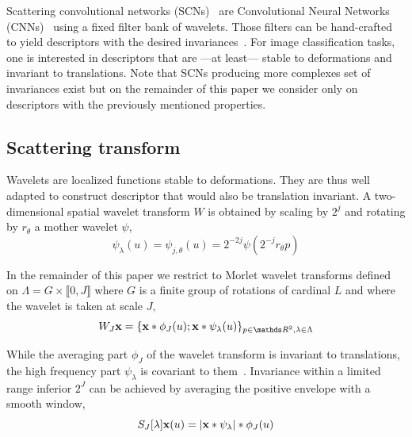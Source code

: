 \documentclass{article}
\begin{document}
    Scattering convolutional networks (SCNs)~\citep{bruna} are Convolutional Neural Networks (CNNs)~\citet{lecun1995convolutional} using a fixed filter bank of wavelets. Those filters can be hand-crafted to yield descriptors with the desired invariances~\citep{work translation invariant, work rotation invariant, work rigid motion}. For image classification tasks, one is interested in descriptors that are ---at least--- stable to deformations and invariant to translations. Note that SCNs producing more complexes set of invariances exist but on the remainder of this paper we consider only on descriptors with the previously mentioned properties.

  
  \subsection{Scattering transform}
    \label{subsec:SCN/ST}
    
    Wavelets are localized functions stable to deformations. They are thus well adapted to construct descriptor that would also be translation invariant. A two-dimensional spatial wavelet transform $W$ is obtained by scaling by $2^{j}$ and rotating by $r_{\theta}$ a mother wavelet $\psi$,
    \vspace{-5pt}
    \begin{equation}
      \label{eq:multi-scale directional wavelet}
      \psi_{\lambda}(u) = \psi_{j,\theta}(u) = 2^{-2j} \psi(2^{-j}r_{\theta}p)
    \end{equation}
    
    In the remainder of this paper we restrict to Morlet wavelet transforms defined on $\Lambda = G \times \llbracket 0,J \rrbracket$ where $G$ is a finite group of rotations of cardinal $L$ and where the wavelet is taken at scale $J$,
    \vspace{-5pt}
    \begin{equation}
      \label{eq:wavelet transform}
      W_{J}\bfx = \{ \bfx \ast \phi_{J}(u); \bfx \ast \psi_{\lambda}(u) \}_{p\in\dsR^{2},\lambda \in \Lambda}
    \end{equation}
    \vspace{-15pt}

    While the averaging part $\phi_{J}$ of the wavelet transform is invariant to translations, the high frequency part $\psi_{\lambda}$ is covariant to them~\citep{mallat}. Invariance within a limited range inferior $2^{J}$ can be achieved by averaging the positive envelope with a smooth window,
    \vspace{-5pt}
    \begin{equation}
      \label{eq:Scattering transform}
      S_{J}[\lambda]{\bf x}(u) = \left| {\bf x} \ast \psi_{\lambda} \right| \ast \phi_{J}(u)
    \end{equation}
    \vspace{-10pt}
    
\end{document}
